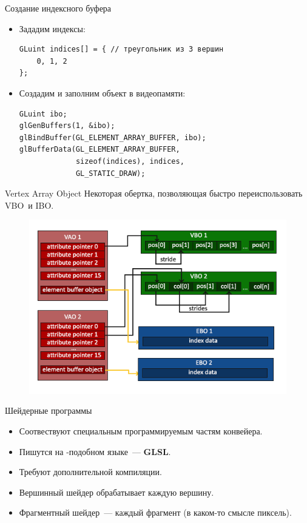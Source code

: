 \documentclass[aspectration=1610,t]{beamer}
\begin{document}
\begin{frame}[fragile]{Создание индексного буфера}
    \begin{itemize}
        \item Зададим индексы:
            {\small \begin{lstlisting}
GLuint indices[] = { // треугольник из 3 вершин
    0, 1, 2
};
            \end{lstlisting}}
        \item Создадим и заполним объект в видеопамяти:
            {\small \begin{lstlisting}
GLuint ibo;
glGenBuffers(1, &ibo);
glBindBuffer(GL_ELEMENT_ARRAY_BUFFER, ibo);
glBufferData(GL_ELEMENT_ARRAY_BUFFER,
             sizeof(indices), indices,
             GL_STATIC_DRAW);
            \end{lstlisting}}
    \end{itemize}
\end{frame}

\begin{frame}[fragile]{Vertex Array Object}
    Некоторая обертка, позволяющая быстро переиспользовать VBO~и IBO.
    \begin{figure}[htp]
        \centering
        \includegraphics[scale=0.40]{vao}
    \end{figure}
\end{frame}

\begin{frame}[fragile]{Шейдерные программы}
    \begin{itemize}
        \item Соотвествуют специальным программируемым частям конвейера.
        \item Пишутся на \langc-подобном языке~--- {\bf GLSL}.
        \item Требуют дополнительной компиляции.
        \item Вершинный шейдер обрабатывает каждую вершину.
        \item Фрагментный шейдер~--- каждый фрагмент (в каком-то смысле пиксель).
    \end{itemize}
\end{frame}
\end{document}
